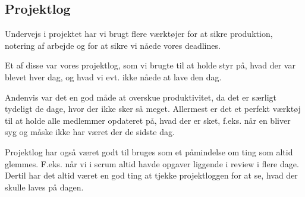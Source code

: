 \subsection{Projektlog}

Undervejs i projektet har vi brugt flere værktøjer for at sikre produktion, notering af arbejde og for at sikre vi nåede vores deadlines.

Et af disse var vores projektlog, som vi brugte til at holde styr på, hvad der var blevet hver dag, og hvad vi evt. ikke nåede at lave den dag.

Andenvis var det en god måde at overskue produktivitet, da det er særligt tydeligt de dage, hvor der ikke sker så meget. Allermest er det et perfekt værktøj til at holde alle medlemmer opdateret på, hvad der er sket, f.eks. når en bliver syg og måske ikke har været der de sidste dag.

Projektlog har også været godt til bruges som et påmindelse om ting som altid glemmes.
F.eks. når vi i scrum altid havde opgaver liggende i review i flere dage.
Dertil har det altid været en god ting at tjekke projektloggen for at se, hvad der skulle laves på dagen.